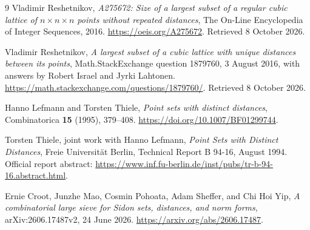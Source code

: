 \documentclass[11pt,letterpaper]{article}
\theoremstyle{definition}
\begin{document}
\begin{thebibliography}{9}
Vladimir Reshetnikov,
\emph{A275672: Size of a largest subset of a regular cubic lattice of
\(n\times n\times n\) points without repeated distances},
The On-Line Encyclopedia of Integer Sequences, 2016.
\url{https://oeis.org/A275672}.
Retrieved 8 October 2026.

Vladimir Reshetnikov,
\emph{A largest subset of a cubic lattice with unique distances between
its points}, Math.StackExchange question 1879760, 3 August 2016,
with answers by Robert Israel and Jyrki Lahtonen.
\url{https://math.stackexchange.com/questions/1879760/}.
Retrieved 8 October 2026.

Hanno Lefmann and Torsten Thiele,
\emph{Point sets with distinct distances},
Combinatorica \textbf{15} (1995), 379--408.
\url{https://doi.org/10.1007/BF01299744}.

Torsten Thiele, joint work with Hanno Lefmann,
\emph{Point Sets with Distinct Distances},
Freie Universit\"at Berlin, Technical Report B 94-16, August 1994.
Official report abstract:
\url{https://www.inf.fu-berlin.de/inst/pubs/tr-b-94-16.abstract.html}.

Ernie Croot, Junzhe Mao, Cosmin Pohoata, Adam Sheffer, and Chi Hoi Yip,
\emph{A combinatorial large sieve for Sidon sets, distances, and norm
forms}, arXiv:2606.17487v2, 24 June 2026.
\url{https://arxiv.org/abs/2606.17487}.
\end{thebibliography}
\end{document}
